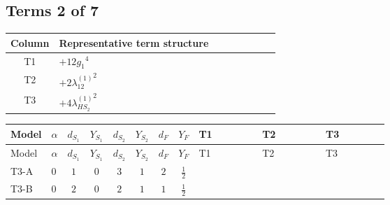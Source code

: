 \documentclass[8pt]{article}
\begin{document}
\begin{landscape}
\subsection*{Terms 2 of 7}
\begin{center}
\begin{tabular}{@{}c >{\raggedright\arraybackslash}p{0.82\linewidth}@{}}
\toprule
Column & Representative term structure \\
\midrule
T1 & \(\displaystyle +12 {g_1}^4\) \\
\midrule
T2 & \(\displaystyle +2 {\lambda_{12}^{(1)}}^2\) \\
\midrule
T3 & \(\displaystyle +4 {\lambda_{HS_2}^{(1)}}^2\) \\
\midrule
\bottomrule
\end{tabular}
\end{center}
\smallskip
\tiny
\begin{longtable}{@{}llcccccc >{\raggedright\arraybackslash}p{0.21\linewidth} >{\raggedright\arraybackslash}p{0.21\linewidth} >{\raggedright\arraybackslash}p{0.21\linewidth}@{}}
\toprule
Model & $\alpha$ & $d_{S_1}$ & $Y_{S_1}$ & $d_{S_2}$ & $Y_{S_2}$ & $d_F$ & $Y_F$ & T1 & T2 & T3 \\
\midrule
\endfirsthead
\toprule
Model & $\alpha$ & $d_{S_1}$ & $Y_{S_1}$ & $d_{S_2}$ & $Y_{S_2}$ & $d_F$ & $Y_F$ & T1 & T2 & T3 \\
\midrule
\endhead
T3-A & $0$ & $1$ & $0$ & $3$ & $1$ & $2$ & $\frac{1}{2}$ & \scriptsize\adjustbox{max width=\linewidth}{$\begin{gathered} +12 {g_1}^4\end{gathered}$} & \scriptsize\adjustbox{max width=\linewidth}{$\begin{gathered} +2 {\lambda_{12}^{(1)}}^2\end{gathered}$} & \scriptsize\adjustbox{max width=\linewidth}{$\begin{gathered} +4 {\lambda_{HS_2}^{(1)}}^2\end{gathered}$} \\
\midrule
T3-B & $0$ & $2$ & $0$ & $2$ & $1$ & $1$ & $\frac{1}{2}$ & \scriptsize\adjustbox{max width=\linewidth}{$\begin{gathered} +12 {g_1}^4\end{gathered}$} & \scriptsize\adjustbox{max width=\linewidth}{$\begin{gathered} +4 {\lambda_{12}^{(1)}}^2\end{gathered}$} & \scriptsize\adjustbox{max width=\linewidth}{$\begin{gathered} +4 {\lambda_{HS_2}^{(1)}}^2\end{gathered}$} \\

\end{longtable}
\end{landscape}
\end{document}
